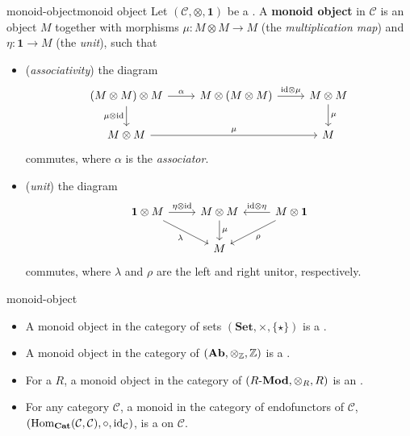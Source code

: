 \begin{topic}{monoid-object}{monoid object}
    Let $(\mathcal{C}, \otimes, \textbf{1})$ be a . A \textbf{monoid object} in $\mathcal{C}$ is an object $M$ together with morphisms $\mu : M \otimes M \to M$ (the \textit{multiplication map}) and $\eta : \textbf{1} \to M$ (the \textit{unit}), such that
    \begin{itemize}
        \item (\textit{associativity}) the diagram
        \[ \begin{tikzcd} (M \otimes M) \otimes M \arrow[swap]{d}{\mu \otimes \id} \arrow{r}{\alpha} & M \otimes (M \otimes M) \arrow{r}{\id \otimes \mu} & M \otimes M \arrow{d}{\mu} \\ M \otimes M \arrow{rr}{\mu} && M \end{tikzcd} \]
        commutes, where $\alpha$ is the \textit{associator}.
        \item (\textit{unit}) the diagram
        \[ \begin{tikzcd} \textbf{1} \otimes M \arrow{r}{\eta \otimes \id} \arrow[swap]{rd}{\lambda} & M \otimes M \arrow{d}{\mu} & M \otimes \textbf{1} \arrow[swap]{l}{\id \otimes \eta} \arrow{dl}{\rho} \\ & M & \end{tikzcd} \]
        commutes, where $\lambda$ and $\rho$ are the left and right unitor, respectively.
    \end{itemize}
\end{topic}

\begin{example}{monoid-object}
    \begin{itemize}
        \item A monoid object in the category of sets $(\textbf{Set}, \times, \{ \star \})$ is a .
        \item A monoid object in the category of  $(\textbf{Ab}, \otimes_{\mathbb{Z}}, \mathbb{Z})$ is a .
        \item For a  $R$, a monoid object in the category of  $(R\textup{-}\textbf{Mod}, \otimes_R, R)$ is an .
        \item For any category $\mathcal{C}$, a monoid in the category of endofunctors of $\mathcal{C}$, $(\text{Hom}_\textbf{Cat}(\mathcal{C}, \mathcal{C}), \circ, \text{id}_\mathcal{C})$, is a  on $\mathcal{C}$.
    \end{itemize}
\end{example}

